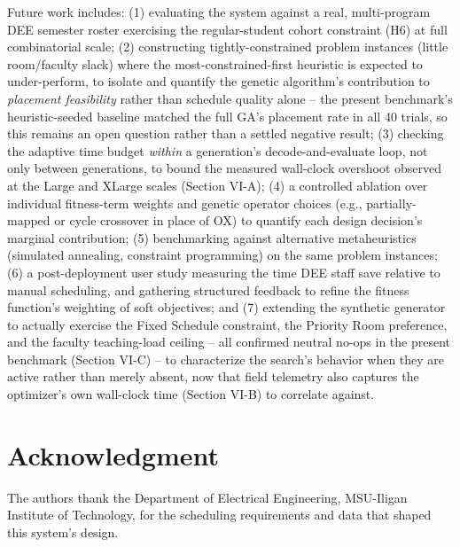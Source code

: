\documentclass[conference]{IEEEtran}
\begin{document}
Future work includes: (1) evaluating the system against a real, multi-program DEE semester roster exercising the regular-student cohort constraint (H6) at full combinatorial scale; (2) constructing tightly-constrained problem instances (little room/faculty slack) where the most-constrained-first heuristic is expected to under-perform, to isolate and quantify the genetic algorithm's contribution to \emph{placement feasibility} rather than schedule quality alone -- the present benchmark's heuristic-seeded baseline matched the full GA's placement rate in all 40 trials, so this remains an open question rather than a settled negative result; (3) checking the adaptive time budget \emph{within} a generation's decode-and-evaluate loop, not only between generations, to bound the measured wall-clock overshoot observed at the Large and XLarge scales (Section VI-A); (4) a controlled ablation over individual fitness-term weights and genetic operator choices (e.g., partially-mapped or cycle crossover in place of OX) to quantify each design decision's marginal contribution; (5) benchmarking against alternative metaheuristics (simulated annealing, constraint programming) on the same problem instances; (6) a post-deployment user study measuring the time DEE staff save relative to manual scheduling, and gathering structured feedback to refine the fitness function's weighting of soft objectives; and (7) extending the synthetic generator to actually exercise the Fixed Schedule constraint, the Priority Room preference, and the faculty teaching-load ceiling -- all confirmed neutral no-ops in the present benchmark (Section VI-C) -- to characterize the search's behavior when they are active rather than merely absent, now that field telemetry also captures the optimizer's own wall-clock time (Section VI-B) to correlate against.

\section*{Acknowledgment}
The authors thank the Department of Electrical Engineering, MSU-Iligan Institute of Technology, for the scheduling requirements and data that shaped this system's design.
\end{document}
